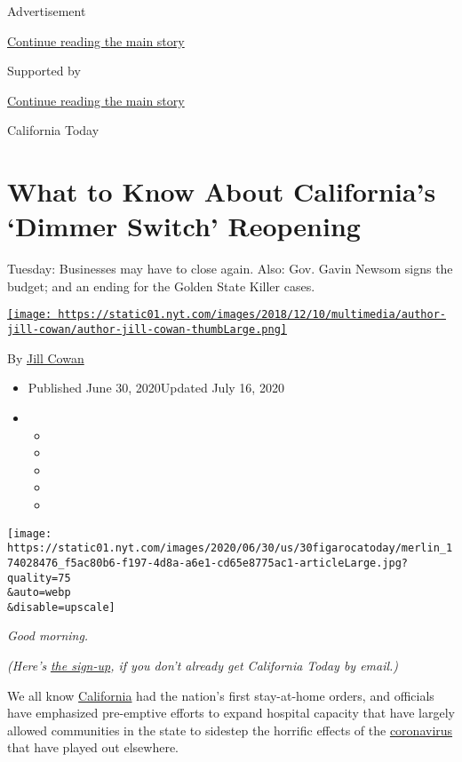 Advertisement

\protect\hyperlink{after-top}{Continue reading the main story}

Supported by

\protect\hyperlink{after-sponsor}{Continue reading the main story}

California Today

\hypertarget{what-to-know-about-californias-dimmer-switch-reopening}{%
\section{What to Know About California's `Dimmer Switch'
Reopening}\label{what-to-know-about-californias-dimmer-switch-reopening}}

Tuesday: Businesses may have to close again. Also: Gov. Gavin Newsom
signs the budget; and an ending for the Golden State Killer cases.

\href{https://www.nytimes.com/by/jill-cowan}{\texttt{[image: https://static01.nyt.com/images/2018/12/10/multimedia/author-jill-cowan/author-jill-cowan-thumbLarge.png]}}

By \href{https://www.nytimes.com/by/jill-cowan}{Jill Cowan}

\begin{itemize}
\item
  Published June 30, 2020Updated July 16, 2020
\item
  \begin{itemize}
  \item
  \item
  \item
  \item
  \item
  \end{itemize}
\end{itemize}

\texttt{[image: https://static01.nyt.com/images/2020/06/30/us/30figarocatoday/merlin\_174028476\_f5ac80b6-f197-4d8a-a6e1-cd65e8775ac1-articleLarge.jpg?quality=75\\\&auto=webp\\\&disable=upscale]}

\emph{Good morning.}

\emph{(Here's}
\href{https://www.nytimes.com/newsletters/california-today}{\emph{the
sign-up}}\emph{, if you don't already get California Today by email.)}

We all know
\href{https://www.nytimes.com/2020/07/16/us/california-coronavirus-cases.html}{California}
had the nation's first stay-at-home orders, and officials have
emphasized pre-emptive efforts to expand hospital capacity that have
largely allowed communities in the state to sidestep the horrific
effects of the
\href{https://www.nytimes.com/2020/07/16/us/california-coronavirus-cases.html}{coronavirus}
that have played out elsewhere.

